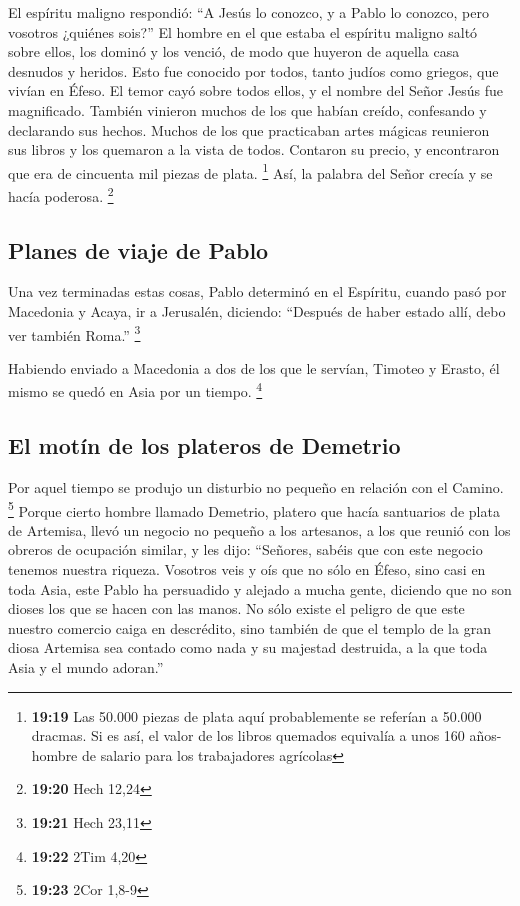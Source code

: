  El espíritu maligno respondió: ``A Jesús lo conozco, y a
Pablo lo conozco, pero vosotros ¿quiénes sois?''  El
hombre en el que estaba el espíritu maligno saltó sobre ellos, los
dominó y los venció, de modo que huyeron de aquella casa desnudos y
heridos.  Esto fue conocido por todos, tanto judíos como
griegos, que vivían en Éfeso. El temor cayó sobre todos ellos, y el
nombre del Señor Jesús fue magnificado.  También vinieron
muchos de los que habían creído, confesando y declarando sus hechos.
 Muchos de los que practicaban artes mágicas reunieron
sus libros y los quemaron a la vista de todos. Contaron su precio, y
encontraron que era de cincuenta mil piezas de plata. \footnote{\textbf{19:19}
  Las 50.000 piezas de plata aquí probablemente se referían a 50.000
  dracmas. Si es así, el valor de los libros quemados equivalía a unos
  160 años-hombre de salario para los trabajadores agrícolas}
 Así, la palabra del Señor crecía y se hacía poderosa.
\footnote{\textbf{19:20} Hech 12,24}

\hypertarget{planes-de-viaje-de-pablo}{%
\subsection{Planes de viaje de Pablo}\label{planes-de-viaje-de-pablo}}

 Una vez terminadas estas cosas, Pablo determinó en el
Espíritu, cuando pasó por Macedonia y Acaya, ir a Jerusalén, diciendo:
``Después de haber estado allí, debo ver también Roma.'' \footnote{\textbf{19:21}
  Hech 23,11}

 Habiendo enviado a Macedonia a dos de los que le
servían, Timoteo y Erasto, él mismo se quedó en Asia por un tiempo.
\footnote{\textbf{19:22} 2Tim 4,20}

\hypertarget{el-motuxedn-de-los-plateros-de-demetrio}{%
\subsection{El motín de los plateros de
Demetrio}\label{el-motuxedn-de-los-plateros-de-demetrio}}

 Por aquel tiempo se produjo un disturbio no pequeño en
relación con el Camino. \footnote{\textbf{19:23} 2Cor 1,8-9}
 Porque cierto hombre llamado Demetrio, platero que hacía
santuarios de plata de Artemisa, llevó un negocio no pequeño a los
artesanos,  a los que reunió con los obreros de ocupación
similar, y les dijo: ``Señores, sabéis que con este negocio tenemos
nuestra riqueza.  Vosotros veis y oís que no sólo en
Éfeso, sino casi en toda Asia, este Pablo ha persuadido y alejado a
mucha gente, diciendo que no son dioses los que se hacen con las manos.
 No sólo existe el peligro de que este nuestro comercio
caiga en descrédito, sino también de que el templo de la gran diosa
Artemisa sea contado como nada y su majestad destruida, a la que toda
Asia y el mundo adoran.''

